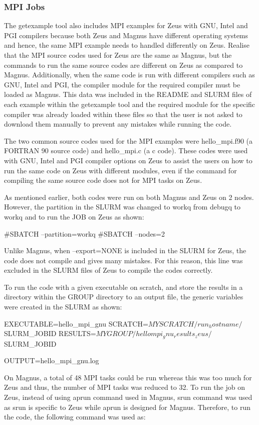 \documentclass[journal]{IEEEtran}
\begin{document}
\subsubsection{MPI Jobs}

The getexample tool also includes MPI examples for Zeus with GNU, Intel and PGI compilers because both Zeus and Magnus have different operating systems 
and hence, the same MPI example needs to handled differently on Zeus. Realise that the MPI source codes used for Zeus are the same
as Magnus, but the commands to run the same source codes are different on Zeus as compared to Magnus. Additionally, when the same code is run 
with different compilers such as GNU, Intel and PGI, the compiler module for the required compiler must be loaded as Magnus. This data was
included in the README and SLURM files of each example within the getexample tool and the required module for the specific compiler was already loaded 
within these files so that the user is not asked to download them manually to prevent any mistakes while running the code.

The two common source codes used for the MPI examples were hello_mpi.f90 (a FORTRAN 90 source code) and hello_mpi.c (a c code). These codes were used 
with GNU, Intel and PGI compiler options on Zeus to assist the users on how to run the same code on Zeus with different modules, even if the command 
for compiling the same source code does not for MPI tasks on Zeus.

As mentioned earlier, both codes were run on both Magnus and Zeus on 2 nodes. However, the partition in the SLURM was changed to workq from debugq to 
workq and to run the JOB on Zeus as shown:

#SBATCH --partition=workq
#SBATCH --nodes=2

Unlike Magnus, when --export=NONE is included in the SLURM for Zeus, the code does not compile and gives many mistakes. For this reason, this line was
excluded in the SLURM files of Zeus to compile the codes correctly.

To run the code with a given executable on scratch, and store the results in a directory within the GROUP directory to an output file, the generic 
variables were created in the SLURM as shown:

EXECUTABLE=hello_mpi_gnu
SCRATCH=$MYSCRATCH/run_hostname/$SLURM_JOBID
RESULTS=$MYGROUP/hellompi_gnu_results_zeus/$SLURM_JOBID

OUTPUT=hello_mpi_gnu.log

On Magnus, a total of 48 MPI tasks could be run whereas this was too much for Zeus and thus, the number of MPI tasks was reduced to 32. To run the job
on Zeus, instead of using aprun command used in Magnus, srun command was used as srun is specific to Zeus while aprun is designed for Magnus. Therefore,
to run the code, the following command was used as:
\end{document}
